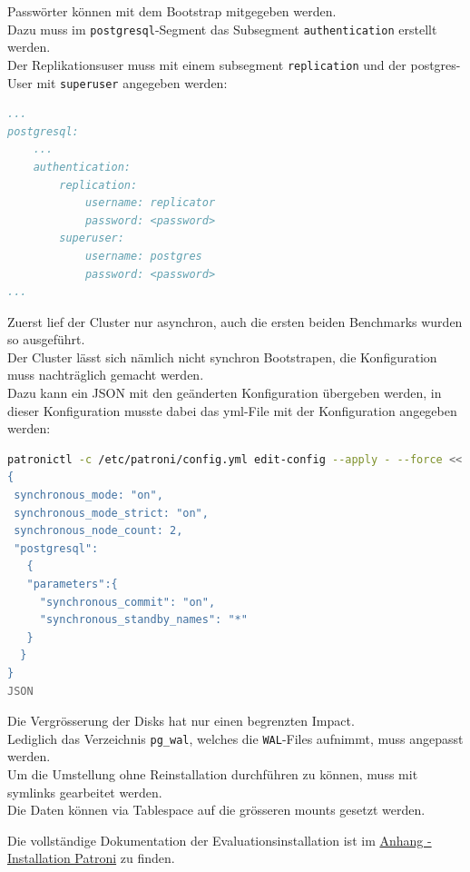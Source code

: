 \begin{flushleft}
    Passwörter können mit dem Bootstrap mitgegeben werden.\\
    Dazu muss im \texttt{postgresql}-Segment das Subsegment \texttt{authentication} erstellt werden.\\
    Der Replikationsuser muss mit einem subsegment \texttt{replication} und der postgres-User mit \texttt{superuser} angegeben werden:
\lstset{style=gra_codestyle}
\begin{lstlisting}[language=yaml, caption=Patroni - Passwörter,captionpos=b,label={lst:patroni_passwords},breaklines=true]
...
postgresql:
    ...
    authentication:
        replication:
            username: replicator
            password: <password>
        superuser:
            username: postgres
            password: <password>
...
\end{lstlisting}
\end{flushleft}
\begin{flushleft}
    Zuerst lief der Cluster nur asynchron, auch die ersten beiden Benchmarks wurden so ausgeführt.\\
    Der Cluster lässt sich nämlich nicht synchron Bootstrapen, die Konfiguration muss nachträglich gemacht werden.\\
    Dazu kann ein JSON mit den geänderten Konfiguration übergeben werden, in dieser Konfiguration musste dabei das yml-File mit der Konfiguration angegeben werden:
\lstset{style=gra_codestyle}
\begin{lstlisting}[language=bash, caption=Patroni - Synchrone Replikation setzen,captionpos=b,label={lst:patroni_set_sync_replication},breaklines=true]
patronictl -c /etc/patroni/config.yml edit-config --apply - --force <<'JSON'
{
 synchronous_mode: "on",
 synchronous_mode_strict: "on",
 synchronous_node_count: 2,
 "postgresql":
   {
   "parameters":{
     "synchronous_commit": "on",
     "synchronous_standby_names": "*"
   }
  }
}
JSON
\end{lstlisting}
\end{flushleft}
\begin{flushleft}
    Die Vergrösserung der Disks hat nur einen begrenzten Impact.\\
    Lediglich das Verzeichnis \texttt{pg\_wal}, welches die \texttt{WAL}-Files aufnimmt, muss angepasst werden.\\
    Um die Umstellung ohne Reinstallation durchführen zu können, muss mit symlinks gearbeitet werden.\\
    Die Daten können via Tablespace auf die grösseren mounts gesetzt werden.\\
\end{flushleft}
\begin{flushleft}
    Die vollständige Dokumentation der Evaluationsinstallation ist im \hyperref[subsec:evaluation_installation_patroni]{Anhang - Installation Patroni} zu finden.
\end{flushleft}